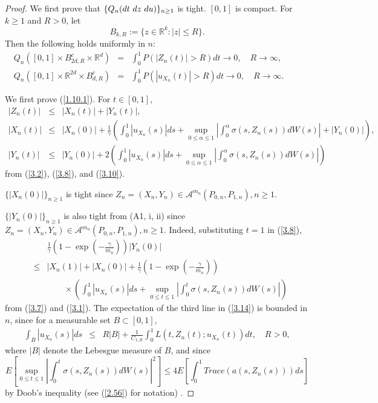 \documentclass[12pt]{article}
\begin{document}
\begin{proof}
We first prove that $\{Q_n (dt\hbox{ }dz\hbox{ }du)\}_{n\ge 1}$ is tight.
$[0,1]$ is compact.
For $k\ge 1$ and $R>0$, let 
$$B_{k,R}:=\{z\in \mathbb{R}^{k}: |z|\le R\}.$$ 
Then the following holds uniformly in $n$:
\begin{eqnarray}
Q_n ([0,1]\times B_{2d,R}^c\times \mathbb{R}^{d})&=&\int_0^1 P(|Z_n(t)|> R)dt
\to 0, \quad R\to \infty,\label{1.10.1}\\
Q_n ([0,1]\times \mathbb{R}^{2d}\times B_{d,R}^c)&=&\int_0^1 P(|u_{X_n}(t)|> R)dt\to 0, 
\quad R\to \infty.\qquad\label{1.11.1}
\end{eqnarray}

We first prove (\ref{1.10.1}). For $t\in [0,1]$,
\begin{eqnarray*}
|Z_n(t)|& \le& |X_n(t)|+|Y_n(t)|,\\
|X_n(t)|& \le& |X_n(0)|+ \frac{1}{\gamma}\left(\int_0^1|u_{X_n}(s)|ds
+\sup_{0\le \alpha\le 1}\left|\int_0^\alpha\sigma (s, Z_n(s))dW(s)\right|+|Y_n(0)|\right),\\
|Y_n(t)|& \le& |Y_n(0)|+ 2\left(\int_0^1|u_{X_n}(s)|ds
+\sup_{0\le \alpha\le 1}\left|\int_0^\alpha\sigma (s, Z_n(s))dW(s)\right|\right)
\end{eqnarray*}
from (\ref{3.2}), (\ref{3.8}), and (\ref{3.10}).

$\{|X_n(0)|\}_{n\ge 1}$ is tight since $Z_n=(X_n, Y_n)\in\mathcal{A}^{m_n}(P_{0,n},P_{1,n}), n\ge 1$.

$\{|Y_n(0)|\}_{n\ge 1}$ is also tight from (A1, i, ii) since $Z_n=(X_n, Y_n)\in\mathcal{A}^{m_n}(P_{0,n},P_{1,n}), n\ge 1$.
Indeed, substituting $t=1$ in (\ref{3.8}),
\begin{eqnarray}\label{3.14}
&&\frac{1}{\gamma}\left(1-\exp\left(-\frac{\gamma}{m_n}\right)\right)
|Y_n(0)|\\
&\le& |X_n(1)|+|X_n(0)| +\frac{1}{\gamma}\left(1-\exp\left(-\frac{\gamma}{m_n}\right)\right)\nonumber\\
&&\qquad \times \left(\int_0^1|u_{X_n}(s)|ds
+\sup_{0\le t\le 1}\left|\int_0^t\sigma (s, Z_n(s))dW(s)\right|\right)
\nonumber
\end{eqnarray}
from (\ref{3.7}) and (\ref{3.1}).
The expectation of the third line in (\ref{3.14}) is bounded in $n$, since for  a measurable set $B\subset [0,1]$,
\begin{eqnarray}\label{4.3}
\int_B |u_{X_n}(s)|ds& \le& 
R|B|+\frac{1}{C_{1,R}}\int_0^1 L(t,Z_n(t);u_{X_n} (t))dt,\quad R>0,
\end{eqnarray}
where $|B|$ denote the Lebesgue measure  of $B$, and since
\begin{equation}\label{3.18}
E\left[\sup_{0\le t\le 1}\left|\int_0^t\sigma (s, Z_n(s))dW(s)\right|^2\right]
\le 4E\left[\int_0^1Trace (a (s, Z_n(s)))ds\right]
\end{equation}
by Doob's inequality (see (\ref{2.56}) for notation) .


\end{proof}
\end{document}
